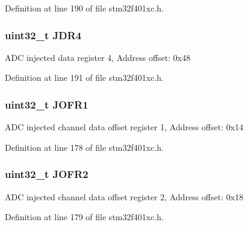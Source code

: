 Definition at line 190 of file stm32f401xc.\+h.

\subsubsection[{\texorpdfstring{J\+D\+R4}{JDR4}}]{ uint32\+\_\+t J\+D\+R4}\hypertarget{struct_a_d_c___type_def_a9274ceea3b2c6d5c1903d0a7abad91a1}{}\label{struct_a_d_c___type_def_a9274ceea3b2c6d5c1903d0a7abad91a1}
A\+DC injected data register 4, Address offset\+: 0x48 

Definition at line 191 of file stm32f401xc.\+h.

\subsubsection[{\texorpdfstring{J\+O\+F\+R1}{JOFR1}}]{ uint32\+\_\+t J\+O\+F\+R1}\hypertarget{struct_a_d_c___type_def_a427dda1678f254bd98b1f321d7194a3b}{}\label{struct_a_d_c___type_def_a427dda1678f254bd98b1f321d7194a3b}
A\+DC injected channel data offset register 1, Address offset\+: 0x14 

Definition at line 178 of file stm32f401xc.\+h.

\subsubsection[{\texorpdfstring{J\+O\+F\+R2}{JOFR2}}]{ uint32\+\_\+t J\+O\+F\+R2}\hypertarget{struct_a_d_c___type_def_a11e65074b9f06b48c17cdfa5bea9f125}{}\label{struct_a_d_c___type_def_a11e65074b9f06b48c17cdfa5bea9f125}
A\+DC injected channel data offset register 2, Address offset\+: 0x18 

Definition at line 179 of file stm32f401xc.\+h.

